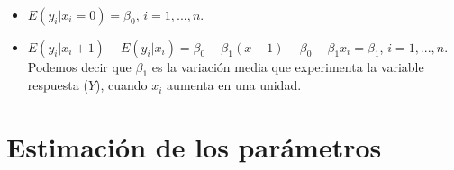 \begin{obs} \
    \begin{itemize}
        \item $E(y_i | x_i = 0) = \beta_0$, $i=1,...,n$.
        \item $E(y_i | x_i + 1) - E(y_i | x_i) = \beta_0 + \beta_1(x+1) - \beta_0 - \beta_1 x_i = \beta_1$, $i=1,...,n$. Podemos decir que $\beta_1$ es la variación media que experimenta la variable respuesta ($Y$), cuando $x_i$ aumenta en una unidad.
    \end{itemize}
\end{obs}

\section{Estimación de los parámetros}


